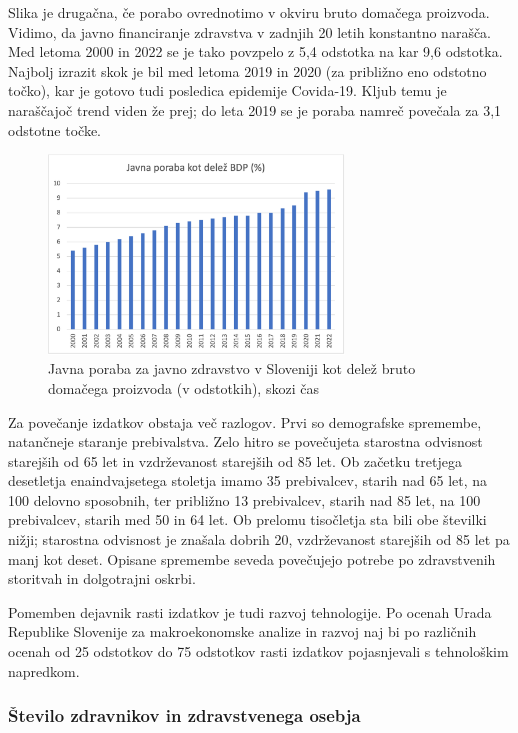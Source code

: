 \documentclass[12pt,a4paper]{article}
\theoremstyle{definition}
\begin{document}
Slika je drugačna, če porabo ovrednotimo v okviru bruto domačega proizvoda. 
Vidimo, da javno financiranje zdravstva v zadnjih 20 letih konstantno narašča. 
Med letoma 2000 in 2022 se je tako povzpelo z 5,4 odstotka na kar 9,6 odstotka. 
Najbolj izrazit skok je bil med letoma 2019 in 2020 (za približno eno odstotno točko), kar je gotovo tudi posledica epidemije Covida-19. 
Kljub temu je naraščajoč trend viden že prej; do leta 2019 se je poraba namreč povečala za 3,1 odstotne točke.

\begin{figure}[H]
    \centering
    \includegraphics[width=0.7\textwidth]{jav_por_bdp_slo.png}
    \caption{Javna poraba za javno zdravstvo v Sloveniji kot delež bruto domačega proizvoda (v odstotkih), skozi čas}
    \label{fig:jav_por_bdp_slo.png}
  \end{figure}

Za povečanje izdatkov obstaja več razlogov. Prvi so demografske spremembe, natančneje staranje prebivalstva. 
Zelo hitro se povečujeta starostna odvisnost starejših od 65 let in vzdrževanost starejših od 85 let. 
Ob začetku tretjega desetletja enaindvajsetega stoletja imamo 35 prebivalcev, starih nad 65 let, na 100 delovno sposobnih, ter približno 13 prebivalcev, starih nad 85 let, na 100 prebivalcev, starih med 50 in 64 let.
Ob prelomu tisočletja sta bili obe številki nižji; starostna odvisnost je znašala dobrih 20, vzdrževanost starejših od 85 let pa manj kot deset. \cite{Sarec2023}
Opisane spremembe seveda povečujejo potrebe po zdravstvenih storitvah in dolgotrajni oskrbi.
  
Pomemben dejavnik rasti izdatkov je tudi razvoj tehnologije. 
Po ocenah Urada Republike Slovenije za makroekonomske analize in razvoj naj bi po različnih ocenah od 25 odstotkov do 75 odstotkov rasti izdatkov pojasnjevali s tehnološkim napredkom. \cite{zdravniska_zbornica_2023}

\subsubsection{Število zdravnikov in zdravstvenega osebja}
\end{document}
